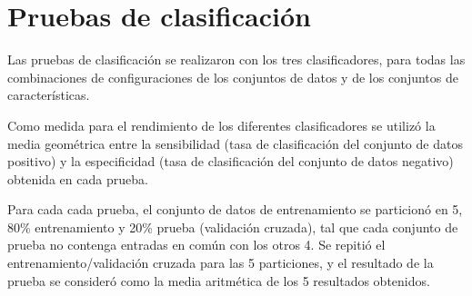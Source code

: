 \documentclass[12pt,bibliography=oldstyle,DIV=12,parskip=half-,titlepage]{scrartcl}
\begin{document}

%



\section{Pruebas de clasificación}

Las pruebas de clasificación se realizaron con los tres
clasificadores, para todas las combinaciones de configuraciones de los
conjuntos de datos y de los conjuntos de características.

Como medida para el rendimiento de los diferentes clasificadores se
utilizó la media geométrica entre la sensibilidad (tasa de
clasificación del conjunto de datos positivo) y la especificidad (tasa
de clasificación del conjunto de datos negativo) obtenida en cada
prueba.

Para cada cada prueba, el conjunto de datos de entrenamiento se
particionó en 5, 80\% entrenamiento y 20\% prueba (validación
cruzada), tal que cada conjunto de prueba no contenga entradas en
común con los otros 4. Se repitió el entrenamiento/validación cruzada
para las 5 particiones, y el resultado de la prueba se consideró como
la media aritmética de los 5 resultados obtenidos.
\end{document}
